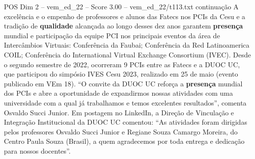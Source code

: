 \begin{textsample}{POS Dim 2 – vem\_ed\_22 – Score 3.00 – vem\_ed\_22/t113.txt}  \label{ex:f2_pos_180}
continuação A excelência e o empenho de professores e alunos das Fatecs nos PCIs da Cesu e a tradição de \textbf{qualidade} alcançada ao longo desses dez anos garantem \textbf{presença} mundial e participação da equipe PCI nos principais eventos da área de Intercâmbios Virtuais: Conferência da Faubai; Conferência da Red Latinoamerica COIL; Conferência do International Virtual Exchange Consortium (IVEC).
Desde o segundo semestre de 2022, ocorreram 9 PCIs entre as Fatecs e a DUOC UC, que participou do simpósio IVES Cesu 2023, realizado em 25 de maio (evento publicado em VEm 18). “O convite da DUOC UC reforça a \textbf{presença} mundial dos PCIs e abre a oportunidade de expandirmos nossas atividades com uma universidade com a qual já trabalhamos e temos excelentes resultados”, comenta Osvaldo Succi Junior.
Em postagem no LinkedIn, a Direção de Vinculação e Integração Institucional da DUOC UC comentou: “As atividades foram dirigidas pelos professores Osvaldo Succi Junior e Regiane Souza Camargo Moreira, do Centro Paula Souza (Brasil), a quem agradecemos por toda entrega e dedicação para nossos docentes”.

\end{textsample}
